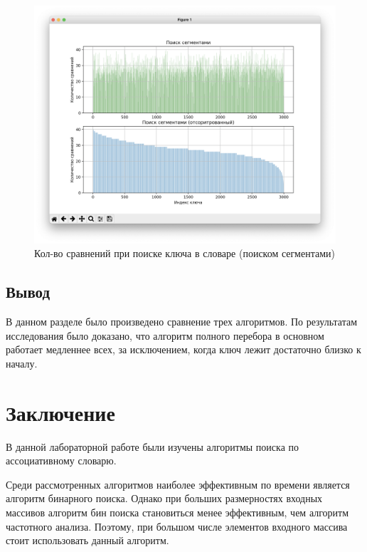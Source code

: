 \documentclass[12pt,a4paper]{report}
\begin{document}
\clearpage

\begin{figure}[h]
	\centering
	\includegraphics[scale=0.45]{graph_segment_search.png}
	\caption{Кол-во сравнений при поиске ключа в словаре (поиском сегментами)}
	\label{fig:graph_segment_search}
\end{figure}




\section{Вывод}

В данном разделе было произведено сравнение трех алгоритмов.
По результатам исследования было доказано, что алгоритм полного перебора
в основном работает медленнее всех, за исключением, когда ключ лежит достаточно
близко к началу.


\newpage
\chapter*{Заключение}
	
В данной лабораторной работе были изучены алгоритмы поиска по ассоциативному словарю.

Среди рассмотренных алгоритмов наиболее эффективным по времени является алгоритм бинарного поиска. Однако при больших размерностях входных массивов алгоритм бин поиска становиться менее эффективным, чем алгоритм частотного анализа. Поэтому, при большом числе элементов входного массива стоит использовать данный алгоритм.
\end{document}

